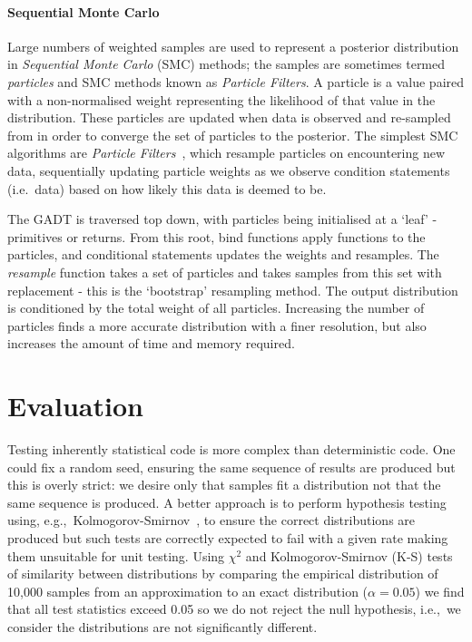 \documentclass[sigconf,timestamp]{acmart}
\begin{document}
\paragraph{Sequential Monte Carlo}
Large numbers of weighted samples are used to represent a posterior distribution in \emph{Sequential Monte Carlo} (SMC) methods; the samples are sometimes termed \emph{particles} and SMC methods known as \emph{Particle Filters}. A particle is a value paired with a non-normalised weight representing the likelihood of that value in the distribution. These particles are updated when data is observed and re-sampled from in order to converge the set of particles to the posterior. The simplest SMC algorithms are \emph{Particle Filters}~\cite{particlefilter}, which resample particles on encountering new data, sequentially updating particle weights as we observe condition statements (i.e.~data) based on how likely this data is deemed to be.

The GADT is traversed top down, with particles being initialised at a `leaf' - primitives or returns. From this root, bind functions apply functions to the particles, and conditional statements updates the weights and resamples. The \emph{resample} function takes a set of particles and takes samples from this set with replacement - this is the `bootstrap' resampling method. The output distribution is conditioned by the total weight of all particles. Increasing the number of particles finds a more accurate distribution with a finer resolution, but also increases the amount of time and memory required.

\section{Evaluation}
\label{s:evaluation}

Testing inherently statistical code is more complex than deterministic code. One could fix a random seed, ensuring the same sequence of results are produced but this is overly strict: we desire only that samples fit a distribution not that the same sequence is produced. A better approach is to perform hypothesis testing using, e.g.,~Kolmogorov-Smirnov~\cite{massey1951kolmogorov}, to ensure the correct distributions are produced but such tests are correctly expected to fail with a given rate making them unsuitable for unit testing. Using $\chi^2$ and Kolmogorov-Smirnov (K-S) tests of similarity between distributions by comparing the empirical distribution of 10,000 samples from an approximation to an exact distribution ($\alpha = 0.05$) we find that all test statistics exceed 0.05 so we do not reject the null hypothesis, i.e.,~we consider the distributions are not significantly different.
\end{document}
